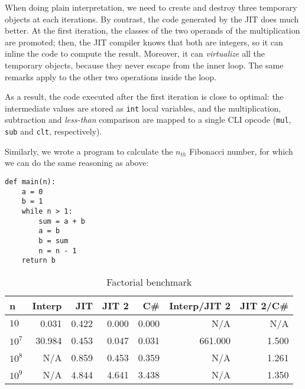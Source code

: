 When doing plain interpretation, we need to create and destroy three temporary
objects at each iterations.  By contrast, the code generated by the JIT does
much better.  At the first iteration, the classes of the two operands of the
multiplication are promoted; then, the JIT compiler knows that both are
integers, so it can inline the code to compute the result.  Moreover, it can
\emph{virtualize} all the temporary objects, because they never escape from
the inner loop.  The same remarks apply to the other two operations inside
the loop.

As a result, the code executed after the first iteration is close to optimal:
the intermediate values are stored as \lstinline{int} local variables, and the
multiplication, subtraction and \emph{less-than} comparison are mapped to a
single CLI opcode (\lstinline{mul}, \lstinline{sub} and \lstinline{clt},
respectively).

Similarly, we wrote a program to calculate the $n_{th}$ Fibonacci number, for
which we can do the same reasoning as above:

\begin{lstlisting}
def main(n):
    a = 0
    b = 1
    while n > 1:
        sum = a + b
        a = b
        b = sum
        n = n - 1
    return b
\end{lstlisting}


\begin{table}[ht]
  \begin{tabular}{|l|r|r|r|r||r|r|}
    \hline
    \textbf{n} & 
    \textbf{Interp} &
    \textbf{JIT} &
    \textbf{JIT 2} &
    \textbf{C\#} &
    \textbf{Interp/JIT 2} &
    \textbf{JIT 2/C\#} \\
    \hline

    $10$    &   0.031  &  0.422  &  0.000  &  0.000  &      N/A  &    N/A \\
    $10^7$  &  30.984  &  0.453  &  0.047  &  0.031  &  661.000  &  1.500 \\
    $10^8$  &     N/A  &  0.859  &  0.453  &  0.359  &      N/A  &  1.261 \\
    $10^9$  &     N/A  &  4.844  &  4.641  &  3.438  &      N/A  &  1.350 \\

    \hline

  \end{tabular}
  \caption{Factorial benchmark}
  \label{tab:factorial}
\end{table}


